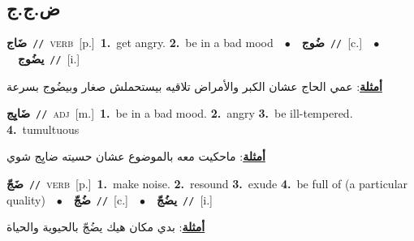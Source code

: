 \documentclass[10pt,a4paper,twoside]{article} %
\begin{document}
\begin{multicols}{2}
\vspace{-3mm}
\subsection*{\color{blue}\foreignlanguage{arabic}{ض.ج.ج}\color{blue}{}} 

{\setlength\topsep{0pt}\textbf{\foreignlanguage{arabic}{ضَاج}}\ {\color{gray}\texttt{//}\color{black}}\ \textsc{verb}\ [p.]\ \textbf{1.}~get angry.  \textbf{2.}~be in a bad mood\ \ $\bullet$\ \ \setlength\topsep{0pt}\textbf{\foreignlanguage{arabic}{ضُوج}}\ {\color{gray}\texttt{//}\color{black}}\ [c.]\ \ $\bullet$\ \ \setlength\topsep{0pt}\textbf{\foreignlanguage{arabic}{يضُوج}}\ {\color{gray}\texttt{//}\color{black}}\ [i.]\  \begin{flushright}\color{gray}\foreignlanguage{arabic}{\textbf{\underline{\foreignlanguage{arabic}{أمثلة}}}: عمي الحاج عشان الكبر والأمراض تلاقيه بيستحملش صغار وبيضُوج بسرعة}\end{flushright}\color{black}} \vspace{2mm}

{\setlength\topsep{0pt}\textbf{\foreignlanguage{arabic}{ضَايِج}}\ {\color{gray}\texttt{//}\color{black}}\ \textsc{adj}\ [m.]\ \textbf{1.}~be in a bad mood.  \textbf{2.}~angry  \textbf{3.}~be ill-tempered.  \textbf{4.}~tumultuous\  \begin{flushright}\color{gray}\foreignlanguage{arabic}{\textbf{\underline{\foreignlanguage{arabic}{أمثلة}}}: ماحكيت معه بالموضوع عشان حسيته ضايِج شوي}\end{flushright}\color{black}} \vspace{2mm}

{\setlength\topsep{0pt}\textbf{\foreignlanguage{arabic}{ضَجّ}}\ {\color{gray}\texttt{//}\color{black}}\ \textsc{verb}\ [p.]\ \textbf{1.}~make noise.  \textbf{2.}~resound  \textbf{3.}~exude  \textbf{4.}~be full of (a particular quality)\ \ $\bullet$\ \ \setlength\topsep{0pt}\textbf{\foreignlanguage{arabic}{ضُجّ}}\ {\color{gray}\texttt{//}\color{black}}\ [c.]\ \ $\bullet$\ \ \setlength\topsep{0pt}\textbf{\foreignlanguage{arabic}{يضُجّ}}\ {\color{gray}\texttt{//}\color{black}}\ [i.]\  \begin{flushright}\color{gray}\foreignlanguage{arabic}{\textbf{\underline{\foreignlanguage{arabic}{أمثلة}}}: بدي مكان هيك يضُجّ بالحيوية والحياة}\end{flushright}\color{black}} \vspace{2mm}


\end{multicols}
\end{document}
